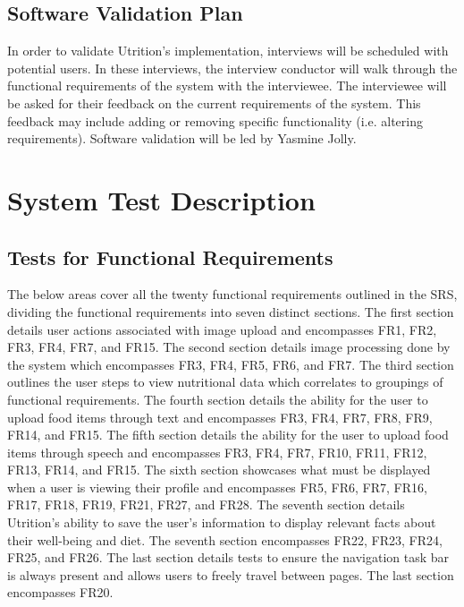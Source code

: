 \documentclass[12pt, titlepage]{article}
\begin{document}
	\subsection{Software Validation Plan}
	
	
	
	
	In order to validate Utrition's implementation, interviews will be scheduled with potential users. In these interviews, the interview conductor will walk through the functional requirements of the system with the interviewee. The interviewee will be asked for their feedback on the current requirements of the system. This feedback may include adding or removing specific functionality (i.e. altering requirements). Software validation will be led by Yasmine Jolly. 
	
	\section{System Test Description}
	
	\subsection{Tests for Functional Requirements}
	The below areas cover all the twenty functional requirements outlined in the SRS, dividing the functional requirements into seven distinct sections. The first section details user actions associated with image upload and encompasses FR1, FR2, FR3, FR4, FR7, and FR15. The second section details image processing done by the system which encompasses FR3, FR4, FR5, FR6, and FR7. The third section outlines the user steps to view nutritional data which correlates to groupings of functional requirements. The fourth section details the ability for the user to upload food items through text and encompasses FR3, FR4, FR7, FR8, FR9, FR14, and FR15. The fifth section details the ability for the user to upload food items through speech and encompasses FR3, FR4, FR7, FR10, FR11, FR12, FR13, FR14, and FR15. The sixth section showcases what must be displayed when a user is viewing their profile and encompasses FR5, FR6, FR7, FR16, FR17, FR18, FR19, FR21, FR27, and FR28. The seventh section details Utrition's ability to save the user's information to display relevant facts about their well-being and diet. The seventh section encompasses FR22, FR23, FR24, FR25, and FR26. The last section details tests to ensure the navigation task bar is always present and allows users to freely travel between pages. The last section encompasses FR20.
	
\end{document}
